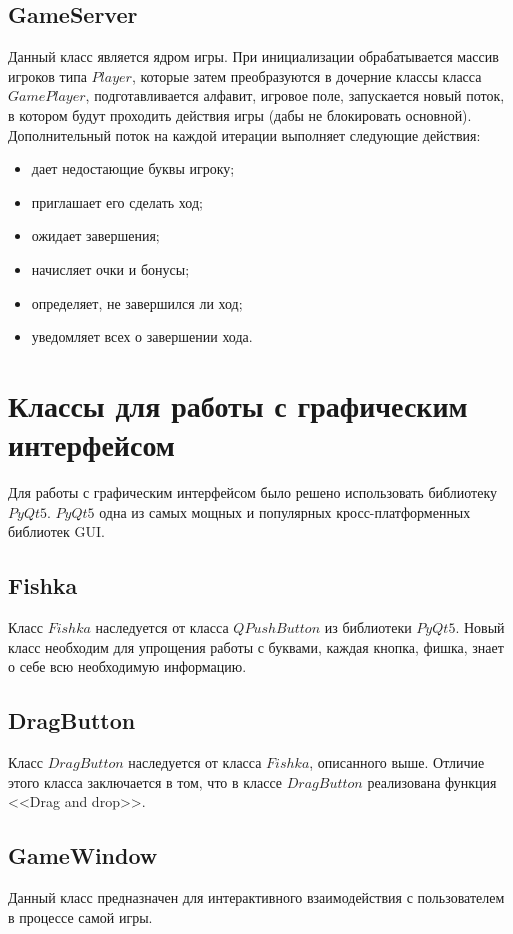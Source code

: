 \documentclass[a4paper,14pt]{article}
\begin{document}
	\subsection{GameServer}
	Данный класс является ядром игры. 
	При инициализации обрабатывается массив игроков типа $Player$, которые затем преобразуются в дочерние классы класса $GamePlayer$, подготавливается алфавит, игровое поле, запускается новый поток, в котором будут проходить действия игры (дабы не блокировать основной). 
	Дополнительный поток на каждой итерации выполняет следующие действия:
	
	\begin {itemize}
		\item дает недостающие буквы игроку;
		\item приглашает его сделать ход;
		\item ожидает завершения;
		\item начисляет очки и бонусы;
		\item определяет, не завершился ли ход;	
		\item уведомляет всех о завершении хода.
	\end {itemize}

	
\section{Классы для работы с графическим интерфейсом}
Для работы с графическим интерфейсом было решено использовать библиотеку $PyQt5$. 
$PyQt5$ одна из самых мощных и популярных кросс-платформенных библиотек GUI.
	\subsection{Fishka}
	Класс $Fishka$ наследуется от класса $QPushButton$ из библиотеки $PyQt5$. 
	Новый класс необходим для упрощения работы с буквами, каждая кнопка, фишка, знает о себе всю необходимую информацию.
	\subsection{DragButton}
	Класс $DragButton$ наследуется от класса $Fishka$, описанного выше. Отличие этого класса заключается в том, что в классе $DragButton$ реализована функция <<Drag and drop>>. 
	\subsection{GameWindow}
	Данный класс предназначен для интерактивного взаимодействия с пользователем в процессе самой игры.
	
\end{document}
